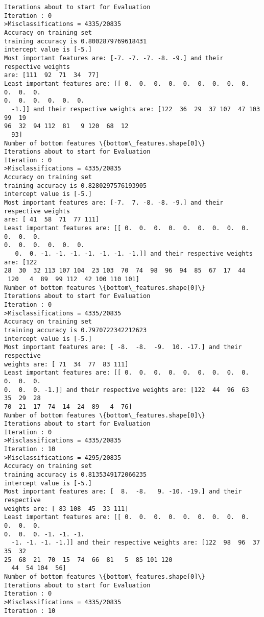 \documentclass[11pt]{article}
\begin{document}
    \begin{Verbatim}[commandchars=\\\{\}]
Iterations about to start for Evaluation
Iteration : 0
>Misclassifications = 4335/20835
Accuracy on training set
training accuracy is 0.8002879769618431
intercept value is [-5.]
Most important features are: [-7. -7. -7. -8. -9.] and their respective weights
are: [111  92  71  34  77]
Least important features are: [[ 0.  0.  0.  0.  0.  0.  0.  0.  0.  0.  0.  0.
0.  0.  0.  0.  0.  0.
  -1.]] and their respective weights are: [122  36  29  37 107  47 103  99  19
96  32  94 112  81   9 120  68  12
  93]
Number of bottom features \{bottom\_features.shape[0]\}
Iterations about to start for Evaluation
Iteration : 0
>Misclassifications = 4335/20835
Accuracy on training set
training accuracy is 0.8280297576193905
intercept value is [-5.]
Most important features are: [-7.  7. -8. -8. -9.] and their respective weights
are: [ 41  58  71  77 111]
Least important features are: [[ 0.  0.  0.  0.  0.  0.  0.  0.  0.  0.  0.  0.
0.  0.  0.  0.  0.  0.
   0.  0. -1. -1. -1. -1. -1. -1. -1.]] and their respective weights are: [122
28  30  32 113 107 104  23 103  70  74  98  96  94  85  67  17  44
 120   4  89  99 112  42 100 110 101]
Number of bottom features \{bottom\_features.shape[0]\}
Iterations about to start for Evaluation
Iteration : 0
>Misclassifications = 4335/20835
Accuracy on training set
training accuracy is 0.7970722342212623
intercept value is [-5.]
Most important features are: [ -8.  -8.  -9.  10. -17.] and their respective
weights are: [ 71  34  77  83 111]
Least important features are: [[ 0.  0.  0.  0.  0.  0.  0.  0.  0.  0.  0.  0.
0.  0.  0. -1.]] and their respective weights are: [122  44  96  63  35  29  28
70  21  17  74  14  24  89   4  76]
Number of bottom features \{bottom\_features.shape[0]\}
Iterations about to start for Evaluation
Iteration : 0
>Misclassifications = 4335/20835
Iteration : 10
>Misclassifications = 4295/20835
Accuracy on training set
training accuracy is 0.8135349172066235
intercept value is [-5.]
Most important features are: [  8.  -8.   9. -10. -19.] and their respective
weights are: [ 83 108  45  33 111]
Least important features are: [[ 0.  0.  0.  0.  0.  0.  0.  0.  0.  0.  0.  0.
0.  0.  0. -1. -1. -1.
  -1. -1. -1. -1.]] and their respective weights are: [122  98  96  37  35  32
25  68  21  70  15  74  66  81   5  85 101 120
  44  54 104  56]
Number of bottom features \{bottom\_features.shape[0]\}
Iterations about to start for Evaluation
Iteration : 0
>Misclassifications = 4335/20835
Iteration : 10

\end{Verbatim}
\end{document}

